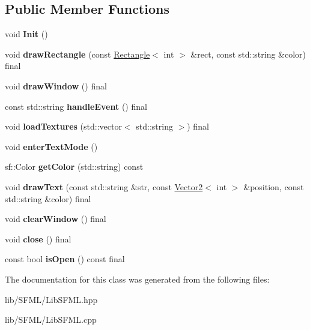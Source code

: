 \subsection*{Public Member Functions}
\begin{DoxyCompactItemize}
\item 
\mbox{\label{class_lib_s_f_m_l_a33fd692ece121874840da35d56d3df4e}} 
void {\bfseries Init} ()
\item 
\mbox{\label{class_lib_s_f_m_l_ab1a5d951083dfc702e79f726cdc5d02f}} 
void {\bfseries draw\+Rectangle} (const \hyperlink{struct_rectangle}{Rectangle}$<$ int $>$ \&rect, const std\+::string \&color) final
\item 
\mbox{\label{class_lib_s_f_m_l_a1e1977ccb48ae960e01768fed04839d8}} 
void {\bfseries draw\+Window} () final
\item 
\mbox{\label{class_lib_s_f_m_l_ad049067dedb7f127e36381c7416a4b9a}} 
const std\+::string {\bfseries handle\+Event} () final
\item 
\mbox{\label{class_lib_s_f_m_l_a0c7f8e6d9cd4f5d6582fa4130cf2ef6d}} 
void {\bfseries load\+Textures} (std\+::vector$<$ std\+::string $>$) final
\item 
\mbox{\label{class_lib_s_f_m_l_af24977140de7d20472a1508263f99b47}} 
void {\bfseries enter\+Text\+Mode} ()
\item 
\mbox{\label{class_lib_s_f_m_l_a7b03cdce04f1f38abadb8b7499c758f9}} 
sf\+::\+Color {\bfseries get\+Color} (std\+::string) const
\item 
\mbox{\label{class_lib_s_f_m_l_ad6f9617cc719daf16da0f339155c83c1}} 
void {\bfseries draw\+Text} (const std\+::string \&str, const \hyperlink{struct_vector2}{Vector2}$<$ int $>$ \&position, const std\+::string \&color) final
\item 
\mbox{\label{class_lib_s_f_m_l_a82143915dd2ff04fecdd0eadc78f8cdd}} 
void {\bfseries clear\+Window} () final
\item 
\mbox{\label{class_lib_s_f_m_l_ad1439ed141a3c01620edbb4188392027}} 
void {\bfseries close} () final
\item 
\mbox{\label{class_lib_s_f_m_l_a7343eab898faa0e2ac2a0e0d867b400f}} 
const bool {\bfseries is\+Open} () const final
\end{DoxyCompactItemize}


The documentation for this class was generated from the following files\+:\begin{DoxyCompactItemize}
\item 
lib/\+S\+F\+M\+L/Lib\+S\+F\+M\+L.\+hpp\item 
lib/\+S\+F\+M\+L/Lib\+S\+F\+M\+L.\+cpp\end{DoxyCompactItemize}

